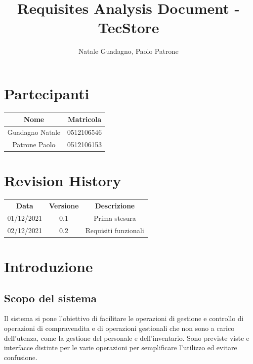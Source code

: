 \documentclass[12pt]{article}
\author{Natale Guadagno, Paolo Patrone}
\title{Requisites Analysis Document - TecStore}
\begin{document}
\maketitle
\newpage
\tableofcontents
\newpage
{}
\section*{Partecipanti}
\begin{center}
\begin{tabular} {|c|c|}
\hline
\textbf{Nome} & \textbf{Matricola} \\
\hline
Guadagno Natale & 0512106546 \\
Patrone Paolo & 0512106153 \\
\hline
\end{tabular}
\end{center}


\section*{Revision History}
\begin{center}
\begin{tabular} {|c|c|c|}
\hline
\textbf{Data} & \textbf{Versione} & \textbf{Descrizione} \\
01/12/2021 & 0.1 & Prima stesura \\
02/12/2021 & 0.2 & Requisiti funzionali \\
\hline

\hline
\end{tabular}
\end{center}

\newpage

\section{Introduzione}

\subsection{Scopo del sistema}
Il sistema si pone l'obiettivo di facilitare le operazioni di gestione e controllo di operazioni di compravendita e di operazioni gestionali che non sono a carico dell'utenza, come la gestione del personale e dell'inventario. Sono previste viste e interfacce distinte per le varie operazioni per semplificare l'utilizzo ed evitare confusione.
\end{document}
